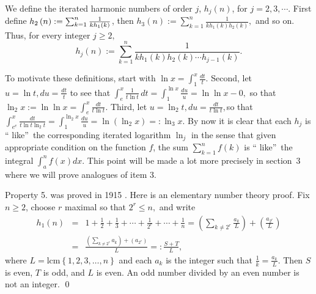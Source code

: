 \documentclass{article}
\theoremstyle{theorem}
\theoremstyle{definition}
\begin{document}
We define the iterated harmonic numbers of order $j$, $h_{j}(n)$, for $%
j=2,3,\cdots $. First define $h_{2}\left( n\right) :=\sum_{k=1}^{n}\frac{1}{%
kh_{1}\left( k\right) }$, then $h_{3}\left( n\right) :=\sum_{k=1}^{n}\frac{1%
}{kh_{1}\left( k\right) h_{2}\left( k\right) },$ and so on. Thus, for every
integer $j\geq 2,$%
\begin{equation*}
h_{j}\left( n\right) :=\sum_{k=1}^{n}\frac{1}{kh_{1}\left( k\right)
h_{2}\left( k\right) \cdots h_{j-1}\left( k\right) }.
\end{equation*}

To motivate these definitions, start with $\ln x=\int_{1}^{x}\frac{dt}{t}.$
Second, let $u=\ln t,du=\frac{dt}{t}$ to see that $\allowbreak \int_{e}^{x}%
\frac{1}{t\ln t}\,dt=\int_{1}^{\ln x}\frac{du}{u}=\ln \ln x-0,$ so that $\ln
_{2}x:=\ln \ln x=\int_{e}^{x}\frac{dt}{t\ln t}$. Third, let $u=\ln _{2}t,du=%
\frac{dt}{t\ln t},$so that $\int_{e^{e}}^{x}\frac{dt}{t\ln t\ln _{2}t}%
=\int_{1}^{\ln _{2}x}\frac{du}{u}=\ln \left( \ln _{2}x\right) =:\ln _{3}x.$
By now it is clear that each $h_{j}$ is \textquotedblleft
like\textquotedblright\ the corresponding iterated logarithm $\ln _{j}$ in
the sense that given appropriate condition on the function $f$, the sum $%
\sum_{k=1}^{n}f\left( k\right) $ is \textquotedblleft
like\textquotedblright\ the integral $\int_{a}^{n}f\left( x\right) dx.$ This
point will be made a lot more precisely in section~3 where we will prove
analogues of item 3.

Property 5. was proved in 1915 \cite{T}. Here is an elementary number theory
proof. Fix $n\geq 2$, choose $r$ maximal so that $2^{r}\leq n,$ and write 
\begin{eqnarray*}
h_{1}\left( n\right) &=&1+\frac{1}{2}+\frac{1}{3}+\cdots +\frac{1}{2^{r}}%
+\cdots +\frac{1}{n}=\left( \sum_{k\neq 2^{r}}\frac{a_{k}}{L}\right) +\left( 
\frac{a_{2^{r}}}{L}\right)  \\
&=&\frac{\left( \sum_{k\neq 2^{r}}a_{k}\right) +\left( a_{2^{r}}\right) }{L}=:%
\frac{S+T}{L},
\end{eqnarray*}%
where $L=\mbox{lcm}\left\{ 1,2,3,\dots ,n\right\} $ and each $a_{k}$ is the
integer such that $\frac{1}{k}=\frac{a_{k}}{L}.$ Then $S$ is even, $T$ is
odd, and $L$ is even. An odd number divided by an even number is not an
integer. \qed
\end{document}
